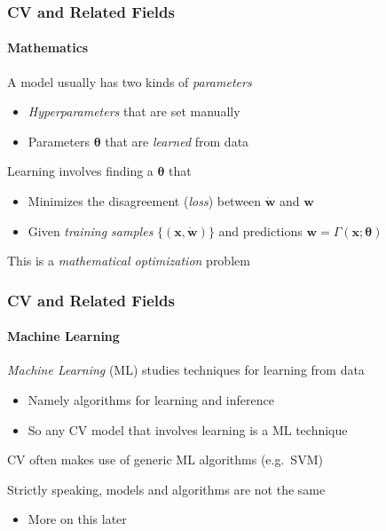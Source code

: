 \documentclass[xetex,professionalfont]{beamer}
\renewcommand{\vec}[1]{\ensuremath{\mathbf{#1}}}
\newcommand{\vw}{\vec{w}}
\newcommand{\vx}{\vec{x}}
\newcommand{\pv}{\ensuremath{\boldsymbol{\theta}}}
\begin{document}
\begin{frame}
\frametitle{CV and Related Fields}
\framesubtitle{Mathematics}

\bigskip
A model usually has two kinds of \emph{parameters}
\begin{itemize}
    \item \emph{Hyperparameters} that are set manually
    \item Parameters $\pv$ that are \emph{learned} from data
\end{itemize}

\bigskip
Learning involves finding a $\pv$ that
\begin{itemize}
    \item Minimizes the disagreement (\emph{loss}) between $\dot{\vw}$ and $\vw$ %
    \item Given \emph{training samples} $\{(\vx,\dot{\vw})\}$ and predictions $\vw=\Gamma(\vx;\pv)$ %
\end{itemize}

\bigskip
This is a \emph{mathematical optimization} problem

\end{frame}


\begin{frame}
\frametitle{CV and Related Fields}
\framesubtitle{Machine Learning}

\emph{Machine Learning} (ML) studies techniques for learning from data
\begin{itemize}
    \item Namely algorithms for learning and inference
    \item So any CV model that involves learning is a ML technique
\end{itemize}

\bigskip
CV often makes use of generic ML algorithms (e.g.\ SVM) %

\bigskip
Strictly speaking, models and algorithms are not the same
\begin{itemize}
    \item More on this later
\end{itemize}

\end{frame}
\end{document}
